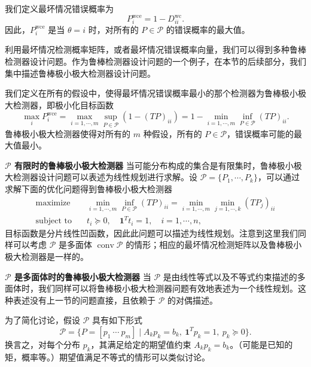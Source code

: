 \documentclass[UTF8, 12pt, fontset=fandol, oneside]{ctexart}
\begin{document}
我们定义最坏情况错误概率为
\[
P_i^{\mathrm{wce}}=1-D_{ii}^{\mathrm{wc}}.
\]
因此，$P_i^{\mathrm{wce}}$ 是当 $\theta=i$ 时，对所有的 $P\in\mathcal{P}$ 的错误概率的最大值。

利用最坏情况检测概率矩阵，或者最坏情况错误概率向量，我们可以得到多种鲁棒检测器设计问题。作为鲁棒检测器设计问题的一个例子，在本节的后续部分，我们集中描述鲁棒极小极大检测器设计问题。

我们定义在所有的假设中，使得最坏情况错误概率最小的那个检测器为鲁棒极小极大检测器，即极小化目标函数
\[
\max_i P_i^{\mathrm{wce}}=\max_{i=1,\cdots,m}\sup_{P\in\mathcal{P}}(1-(TP)_{ii})
=1-\min_{i=1,\cdots,m}\inf_{P\in\mathcal{P}}(TP)_{ii}.
\]
鲁棒极小极大检测器使得对所有的 $m$ 种假设，所有的 $P\in\mathcal{P}$，错误概率可能的最大值最小。

\noindent\textbf{$\mathcal{P}$ 有限时的鲁棒极小极大检测器}\quad
当可能分布构成的集合是有限集时，鲁棒极小极大检测器设计问题可以表述为线性规划进行求解。设 $\mathcal{P}=\{P_1,\cdots,P_k\}$，可以通过求解下面的优化问题得到鲁棒极小极大检测器
\[
\begin{aligned}
\text{maximize}\quad & \min_{i=1,\cdots,m}\inf_{P\in\mathcal{P}}(TP)_{ii}
=\min_{i=1,\cdots,m}\min_{j=1,\cdots,k}(TP_j)_{ii}\\
\text{subject to}\quad & t_i\succeq 0,\quad \mathbf{1}^Tt_i=1,\quad i=1,\cdots,n,
\end{aligned}
\]
目标函数是分片线性凹函数，因此此问题可以描述为线性规划。注意到这里我们同样可以考虑 $\mathcal{P}$ 是多面体 $\operatorname{conv}\mathcal{P}$ 的情形；相应的最坏情况检测矩阵以及鲁棒极小极大检测器是一样的。

\noindent\textbf{$\mathcal{P}$ 是多面体时的鲁棒极小极大检测器}\quad
当 $\mathcal{P}$ 是由线性等式以及不等式约束描述的多面体时，我们同样可以将鲁棒极小极大检测器问题有效地表述为一个线性规划。这种表述没有上一节的问题直接，且依赖于 $\mathcal{P}$ 的对偶描述。

为了简化讨论，假设 $\mathcal{P}$ 具有如下形式
\begin{equation}
\mathcal{P}=\{P=[p_1\ \cdots\ p_m]\mid A_kp_k=b_k,\ \mathbf{1}^Tp_k=1,\ p_k\succeq 0\}.
\tag{7.16}
\end{equation}
换言之，对每个分布 $p_k$，其满足给定的期望值约束 $A_kp_k=b_k$。（可能是已知的矩，概率等。）期望值满足不等式的情形可以类似讨论。
\end{document}
